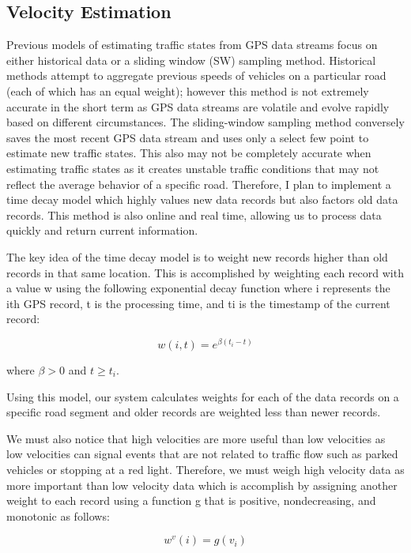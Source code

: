 \documentclass{vldb}
\begin{document}
\subsection{Velocity Estimation}
Previous models of estimating traffic states from GPS data streams focus on either historical data or a sliding window (SW) sampling method. Historical methods attempt to aggregate previous speeds of vehicles on a particular road (each of which has an equal weight); however this method is not extremely accurate in the short term as GPS data streams are volatile and evolve rapidly based on different circumstances. The sliding-window sampling method conversely saves the most recent GPS data stream and uses only a select few point to estimate new traffic states. This also may not be completely accurate when estimating traffic states as it creates unstable traffic conditions that may not reflect the average behavior of a specific road. Therefore, I plan to implement a time decay model which highly values new data records but also factors old data records. This method is also online and real time, allowing us to process data quickly and return current information. 

The key idea of the time decay model is to weight new records higher than old records in that same location. This is accomplished by weighting each record with a value w using the following exponential decay function where i represents the ith GPS record, t is the processing time, and ti is the timestamp of the current record:

\begin{equation}w(i,t)=e^{\beta(t_i-t)}\end{equation}

where $\beta > 0$ and $t \geq t_i$.

Using this model, our system calculates weights for each of the data records on a specific road segment and older records are weighted less than newer records. 

We must also notice that high velocities are more useful than low velocities as low velocities can signal events that are not related to traffic flow such as parked vehicles or stopping at a red light. Therefore, we must weigh high velocity data as more important than low velocity data which is accomplish by assigning another weight to each record using a function g that is positive, nondecreasing, and monotonic as follows:

\begin{equation}w^v(i)=g(v_i)\end{equation}
\end{document}
